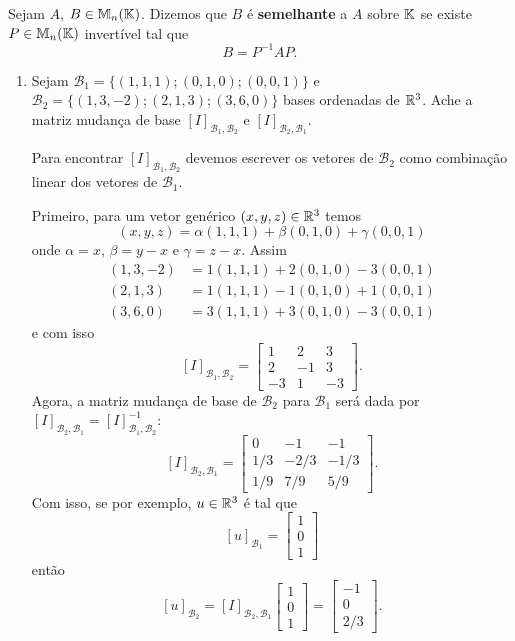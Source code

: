 \begin{definicao}
  Sejam $A$, $B \in \mathbb{M}_n(\mathbb{K})$. Dizemos que $B$ é \textbf{semelhante} a $A$ sobre $\mathbb{K}$ se existe $P \in \mathbb{M}_n(\mathbb{K})$ invertível tal que
  \[
    B = P^{-1}AP.
  \]
\end{definicao}

\begin{exemplos}
  \begin{enumerate}[label={\arabic*})]
    \item Sejam $\mathcal{B}_1 = \{(1, 1, 1); (0, 1, 0); (0, 0, 1)\}$ e $\mathcal{B}_2 = \{(1, 3, -2); (2, 1, 3); (3, 6, 0)\}$ bases ordenadas de $\mathbb{R}^3$. Ache a matriz mudança de base $[I]_{\mathcal{B}_1, \mathcal{B}_2}$ e $[I]_{\mathcal{B}_2, \mathcal{B}_1}$.
      \begin{solucao}
        Para encontrar $[I]_{\mathcal{B}_1, \mathcal{B}_2}$ devemos escrever os vetores de $\mathcal{B}_2$ como combinação linear dos vetores de $\mathcal{B}_1$.

        Primeiro, para um vetor genérico $(x, y, z) \in \mathbb{R}^3$ temos
        \[
          (x, y, z) = \alpha(1, 1, 1) + \beta(0, 1, 0) + \gamma(0, 0, 1)
        \]
        onde $\alpha = x$, $\beta = y - x$ e $\gamma = z - x$. Assim
        \begin{align*}
          (1, 3, -2) &= 1(1, 1, 1) + 2(0, 1, 0) - 3(0, 0, 1)\\
          (2, 1, 3) &= 1(1, 1, 1) - 1(0, 1, 0) + 1(0, 0, 1)\\
          (3, 6, 0) &= 3(1, 1, 1) + 3(0, 1, 0) - 3(0, 0, 1)
        \end{align*}
        e com isso
        \[
          [I]_{\mathcal{B}_1, \mathcal{B}_2} = \begin{bmatrix}1 & 2 & 3\\2 & -1 & 3\\-3 & 1 & -3\end{bmatrix}.
        \]
        Agora, a matriz mudança de base de $\mathcal{B}_2$ para $\mathcal{B}_1$ será dada por $[I]_{\mathcal{B}_2, \mathcal{B}_1} = [I]_{\mathcal{B}_1, \mathcal{B}_2}^{-1}$:
        \[
          [I]_{\mathcal{B}_2, \mathcal{B}_1} = \begin{bmatrix}0 & -1 & -1\\1/3 & -2/3 & -1/3\\1/9 & 7/9 & 5/9\end{bmatrix}.
        \]
        Com isso, se por exemplo, $u \in \mathbb{R}^3$ é tal que
        \[
          [u]_{\mathcal{B}_1} = \begin{bmatrix}1\\0\\1\end{bmatrix}
        \]
        então
        \[
          [u]_{\mathcal{B}_2} = [I]_{\mathcal{B}_2, \mathcal{B}_1}\begin{bmatrix}1\\0\\1\end{bmatrix} = \begin{bmatrix}-1\\0\\2/3\end{bmatrix}.
        \]
      \end{solucao}


\end{enumerate}
\end{exemplos}
